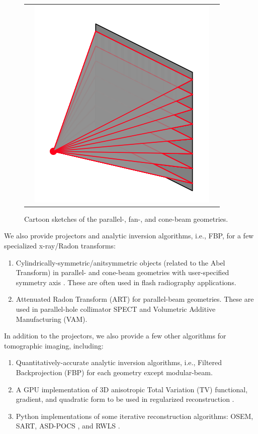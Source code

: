 \documentclass[11pt]{article}
\begin{document}
\begin{figure}[h]
\begin{tabular}{ccc}
& \includegraphics[scale=0.35]{coneBeam}
\end{tabular}
\caption{Cartoon sketches of the parallel-, fan-, and cone-beam geometries.} \label{fig:geometrySketches}
\end{figure}

We also provide projectors and analytic inversion algorithms, i.e., FBP, for a few specialized x-ray/Radon transforms:
\begin{enumerate}
\item Cylindrically-symmetric/anitsymmetric objects (related to the Abel Transform) in parallel- and cone-beam geometries with user-specified symmetry axis \cite{ChampleyMaddox_Optica_2021}. These are often used in flash radiography applications.
\item Attenuated Radon Transform (ART) for parallel-beam geometries. These are used in parallel-hole collimator SPECT and Volumetric Additive Manufacturing (VAM).
\end{enumerate}

In addition to the projectors, we also provide a few other algorithms for tomographic imaging, including:
\begin{enumerate}
\item Quantitatively-accurate analytic inversion algorithms, i.e., Filtered Backprojection (FBP) for each geometry except modular-beam.
\item A GPU implementation of 3D anisotropic Total Variation (TV) functional, gradient, and quadratic form to be used in regularized reconstruction \cite{Yu_MIC_2006}.
\item Python implementations of some iterative reconstruction algorithms: OSEM, SART, ASD-POCS \cite{ASDPOCS_PMB_2008}, and RWLS \cite{Hager_Zhang_CG_2005, Fessler_TIP_1999, Yu_MIC_2006}.
\end{enumerate}
\end{document}
